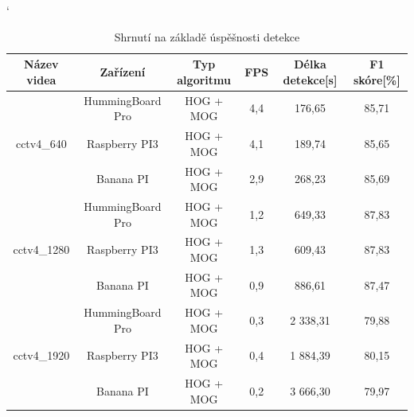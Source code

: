 \begin{table}[H]
\catcode`
\centering
\caption{Shrnutí na základě úspěšnosti detekce}
\label{sumAccTab}
\begin{tabular}{|c|c|c|c|c|c|}
\hline
{Název videa}               &{Zařízení}          & Typ algoritmu & FPS & Délka detekce[s] & F1 skóre[\%] \\  \hline
\multirow{3}{*}{cctv4\_640} & HummingBoard Pro   & HOG + MOG     & 4,4 & 176,65           &  85,71       \\ \cline{2-6}  
                            & Raspberry PI3      & HOG + MOG     & 4,1 & 189,74           &  85,65       \\ \cline{2-6}  
                            & Banana PI          & HOG + MOG     & 2,9 & 268,23           &  85,69       \\ \hline \hline   
\multirow{3}{*}{cctv4\_1280}& HummingBoard Pro   & HOG + MOG     & 1,2 & 649,33           &  87,83       \\ \cline{2-6}  
                            & Raspberry PI3      & HOG + MOG     & 1,3 & 609,43           &  87,83       \\ \cline{2-6}  
                            & Banana PI          & HOG + MOG     & 0,9 & 886,61           &  87,47       \\ \hline \hline    
\multirow{3}{*}{cctv4\_1920}& HummingBoard Pro   & HOG + MOG     & 0,3 & 2 338,31         &  79,88       \\ \cline{2-6}  
                            & Raspberry PI3      & HOG + MOG     & 0,4 & 1 884,39         &  80,15       \\ \cline{2-6}  
                            & Banana PI          & HOG + MOG     & 0,2 & 3 666,30         &  79,97       \\ \hline
\end{tabular}
\end{table}

